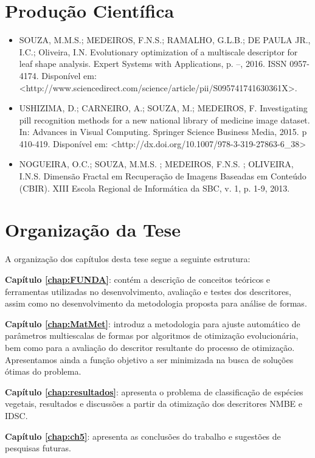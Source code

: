 \section {Produção Científica \label{sec:prod_cientif}}
\begin{itemize}

\item SOUZA, M.M.S.; MEDEIROS, F.N.S.; RAMALHO, G.L.B.; DE PAULA JR., I.C.; Oliveira, I.N. Evolutionary optimization of a multiscale descriptor for leaf
shape analysis. Expert Systems with Applications, p. –, 2016. ISSN 0957-4174. Disponível
em: <http://www.sciencedirect.com/science/article/pii/S095741741630361X>.

\item USHIZIMA, D.; CARNEIRO, A.; SOUZA, M.; MEDEIROS, F. Investigating pill recognition methods for a new national library of
medicine image dataset. In: Advances in Visual Computing. Springer Science Business Media, 2015. p 410-419. Disponível em: <http://dx.doi.org/10.1007/978-3-319-27863-6\_38>


\item NOGUEIRA, O.C.; SOUZA, M.M.S. ; MEDEIROS, F.N.S. ; OLIVEIRA, I.N.S. Dimensão Fractal em Recuperação de Imagens Baseadas em Conteúdo (CBIR). XIII Escola Regional de Informática da SBC, v. 1, p. 1-9, 2013.

\end{itemize}
\section{Organização da Tese \label{sec:org}}

A organização dos capítulos desta tese segue a seguinte estrutura:

\noindent \textbf{Capítulo \ref{chap:FUNDA}}: contém a descrição de conceitos teóricos e ferramentas utilizadas no desenvolvimento, avaliação e testes dos descritores, assim como no desenvolvimento da metodologia proposta para análise de formas.

\noindent \textbf{Capítulo \ref{chap:MatMet}}:  introduz a metodologia para ajuste automático de parâmetros multiescalas de formas por algoritmos de otimização evolucionária, bem como para a avaliação do descritor resultante do processo de otimização. Apresentamos ainda a função objetivo a ser minimizada na busca de soluções ótimas do problema.

\noindent \textbf{Capítulo \ref{chap:resultados}}: apresenta o problema de classificação de espécies vegetais, resultados e discussões a partir da otimização dos descritores \ac{NMBE} e \ac{IDSC}.

\noindent \textbf{Capítulo \ref{chap:ch5}}: apresenta as conclusões do trabalho e sugestões de pesquisas futuras. 
